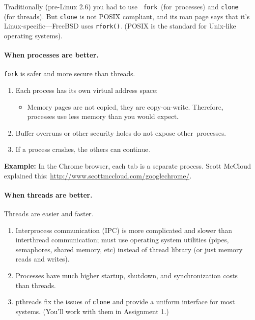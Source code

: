\documentclass[a4paper]{report}
\begin{document}
Traditionally (pre-Linux 2.6) you had to use {\tt
  fork}~(for~processes) and {\tt clone} (for threads). But {\tt clone}
is not POSIX compliant, and its man page says that it's
Linux-specific---FreeBSD uses {\tt rfork()}. (POSIX is the standard
for Unix-like operating systems).

\paragraph{When processes are better.} {\tt fork} is safer and more secure than threads.

  \begin{enumerate}
    \item Each process has its own virtual address space:
      \begin{itemize}
        \item Memory pages are not copied, they are copy-on-write. Therefore, processes use less memory than you would expect.
      \end{itemize}
    \item Buffer overruns or other security holes do not expose other~processes.
    \item If a process crashes, the others can continue.
  \end{enumerate}

{\bf Example:} In the Chrome browser, each tab is a separate
process. Scott McCloud explained this:
\url{http://www.scottmccloud.com/googlechrome/}.

\paragraph{When threads are better.} Threads are easier and faster.

  \begin{enumerate}
    \item Interprocess communication (IPC) is more complicated and slower than interthread
          communication; must use operating system utilities (pipes, semaphores, shared
              memory, etc) instead of thread library (or just memory reads and writes).
    \item Processes have much higher startup, shutdown, and synchronization costs than threads.
    \item pthreads fix the issues of {\tt clone} and provide a
          uniform interface for most systems. (You'll work with them in Assignment 1.)
  \end{enumerate}
\end{document}
